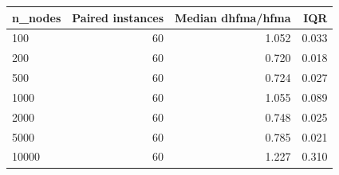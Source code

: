 \begin{tabular}{lrrr}
\toprule
n\_nodes & Paired instances & Median dhfma/hfma & IQR \\
\midrule
100 & 60 & 1.052 & 0.033 \\
200 & 60 & 0.720 & 0.018 \\
500 & 60 & 0.724 & 0.027 \\
1000 & 60 & 1.055 & 0.089 \\
2000 & 60 & 0.748 & 0.025 \\
5000 & 60 & 0.785 & 0.021 \\
10000 & 60 & 1.227 & 0.310 \\
\bottomrule
\end{tabular}
